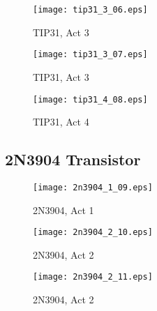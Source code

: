	\begin{figure}[hb!]
		\centering
		\texttt{[image: tip31\_3\_06.eps]}
		\caption{TIP31, Act 3}
		\label{fig:t6}
	\end{figure}

	\begin{framed}
	
	\end{framed}

	\begin{figure}[hb!]
		\centering
		\texttt{[image: tip31\_3\_07.eps]}
		\caption{TIP31, Act 3}
		\label{fig:t7}
	\end{figure}

	\begin{framed}
	
	\end{framed}

	\begin{figure}[hb!]
		\centering
		\texttt{[image: tip31\_4\_08.eps]}
		\caption{TIP31, Act 4}
		\label{fig:t8}
	\end{figure}

	\begin{framed}
	
	\end{framed}


\subsection{2N3904 Transistor}


	\begin{figure}[hb!]
		\centering
		\texttt{[image: 2n3904\_1\_09.eps]}
		\caption{2N3904, Act 1}
		\label{fig:n1}
	\end{figure}

	\begin{framed}
	
	\end{framed}

	\begin{figure}[hb!]
		\centering
		\texttt{[image: 2n3904\_2\_10.eps]}
		\caption{2N3904, Act 2}
		\label{fig:n2}
	\end{figure}

	\begin{framed}
	
	\end{framed}
	
	\begin{figure}[hb!]
		\centering
		\texttt{[image: 2n3904\_2\_11.eps]}
		\caption{2N3904, Act 2}
		\label{fig:n3}
	\end{figure}

